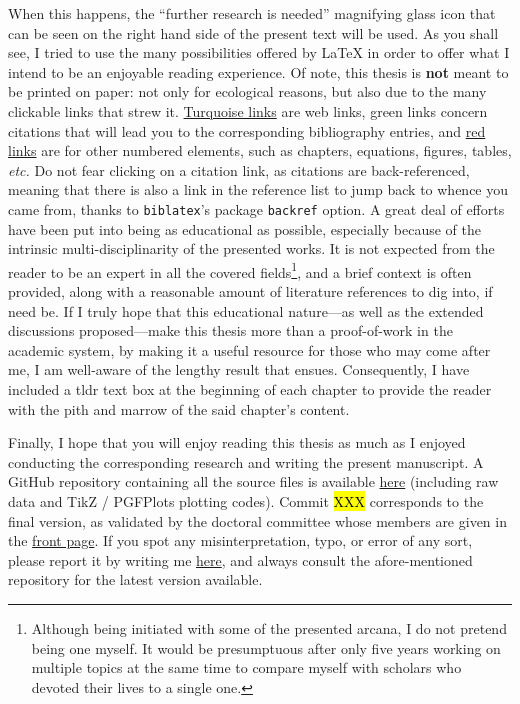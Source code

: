 \mfrin{}When this happens, the \enquote{further research is needed} magnifying glass icon that can be seen on the right hand side of the present text will be used. As you shall see, I tried to use the many possibilities offered by \LaTeX{} in order to offer what I intend to be an enjoyable reading experience. Of note, this thesis is \textbf{not} meant to be printed on paper: not only for ecological reasons, but also due to the many clickable links that strew it. \href{https://archive.org/details/lshort}{Turquoise links} are web links, green links\cite{oetiker2007} concern citations that will lead you to the corresponding bibliography entries, and \hyperlink{forechap:foreword}{red links} are for other numbered elements, such as chapters, equations, figures, tables, \emph{etc.} Do not fear clicking on a citation link, as citations are back-referenced, meaning that there is also a link in the reference list to jump back to whence you came from, thanks to \texttt{biblatex}'s package \texttt{backref} option.
\clearpage
A great deal of efforts have been put into being as educational as possible, especially because of the intrinsic multi-disciplinarity of the presented works. It is not expected from the reader to be an expert in all the covered fields\footnote{Although being initiated with some of the presented arcana, I do not pretend being one myself. It would be presumptuous after only five years working on multiple topics at the same time to compare myself with scholars who devoted their lives to a single one.}, and a brief context is often provided, along with a reasonable amount of literature references to dig into, if need be. If I truly hope that this educational nature---as well as the extended discussions proposed---make this thesis more than a proof-of-work in the academic system, \ie{} by making it a useful resource for those who may come after me, I am well-aware of the lengthy result that ensues. Consequently, I have included a \gls{tldr} text box at the beginning of each chapter to provide the reader with the pith and marrow of the said chapter's content.

Finally, I hope that you will enjoy reading this thesis as much as I enjoyed conducting the corresponding research and writing the present manuscript. A GitHub repository containing all the source files is available \href{https://github.com/e-dervieux/phd_thesis}{here} (including raw data and TikZ / PGFPlots plotting codes). Commit \hl{XXX} corresponds to the final version, as validated by the doctoral committee whose members are given in the \hyperlink{page.1}{front page}. If you spot any misinterpretation, typo, or error of any sort, please report it by writing me  \href{mailto:emmanuel.dervieux@gmail.com}{here}, and always consult the afore-mentioned repository for the latest version available.

